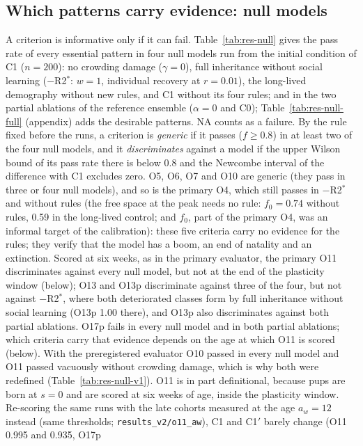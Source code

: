 \subsection{Which patterns carry evidence: null models}
\label{sec:res-null}

A criterion is informative only if it can fail. Table~\ref{tab:res-null} gives the pass rate of every essential
pattern in four null models run from the initial condition of \textsf{C1} ($n=200$): no crowding damage
($\gamma=0$), full inheritance without social learning ($-$R2$^*$: $w=1$, individual recovery at $r=0.01$), the
long-lived demography without new rules, and \textsf{C1} without its four rules; and in the two partial ablations of
the reference ensemble ($\alpha=0$ and \textsf{C0}); Table~\ref{tab:res-null-full} (appendix) adds the desirable
patterns. NA counts as a failure. By the rule fixed before the runs, a criterion is \emph{generic} if it passes
($f\ge0.8$) in at least two of the four null models, and it \emph{discriminates} against a model if the upper
Wilson bound of its pass rate there is below 0.8 and the Newcombe interval of the difference with \textsf{C1}
excludes zero.
O5, O6, O7 and O10 are generic (they pass in three or four null models), and so is the primary O4, which still
passes in $-$R2$^*$ and without rules (the free space at the peak needs no rule: $f_0=0.74$ without rules, 0.59 in
the long-lived control; and $f_0$, part of the primary O4, was an informal target of the calibration): these five criteria
carry no evidence for the rules; they verify that the model has a boom, an end of natality and an extinction. Scored at six weeks, as in the primary evaluator, the
primary O11 discriminates against every null model, but not at the end of the plasticity window (below); O13 and
O13p discriminate against three of the four, but not
against $-$R2$^*$, where both deteriorated classes form by full inheritance without social learning (O13p 1.00
there), and O13p also discriminates against both partial ablations. O17p fails in every null model and in both
partial ablations; which criteria carry that evidence depends on the age at which O11 is scored (below). With the preregistered evaluator O10 passed in every null model
and O11 passed vacuously without crowding damage, which is why both were redefined (Table~\ref{tab:res-null-v1}).
O11 is in part definitional, because pups are born at $s=0$ and are scored at six weeks of age, inside the
plasticity window. Re-scoring the same runs with the late cohorts measured at the age $a_w=12$ instead (same
thresholds; \texttt{results\_v2/o11\_aw}), \textsf{C1} and \textsf{C1}$'$ barely change (O11 0.995 and 0.935, O17p
